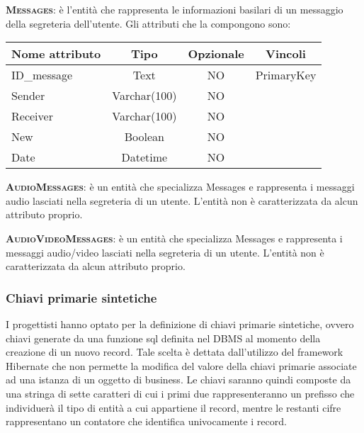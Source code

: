 \begin{description}
	\item{\scshape\bfseries Messages}: è l'entità che rappresenta le informazioni basilari di un messaggio della segreteria dell'utente. Gli attributi che la compongono sono:

\begin{center}
\begin{tabular}{lccc}
\toprule
Nome attributo & Tipo & Opzionale & Vincoli\\
\midrule %
ID\_message & Text & NO & PrimaryKey\\
Sender & Varchar(100) & NO & \\
Receiver & Varchar(100) & NO & \\
New & Boolean & NO & \\
Date & Datetime & NO & \\
\bottomrule
\end{tabular}
\end{center}	
	
	\item{\scshape\bfseries AudioMessages}: è un entità che specializza Messages e rappresenta i messaggi audio lasciati nella segreteria di un utente. L'entità non è caratterizzata da alcun attributo proprio.
	
	\item{\scshape\bfseries AudioVideoMessages}: è un entità che specializza Messages e rappresenta i messaggi audio/video lasciati nella segreteria di un utente.  L'entità non è caratterizzata da alcun attributo proprio.	
	
\end{description}

\subsubsection{Chiavi primarie sintetiche}
I progettisti hanno optato per la definizione di chiavi primarie sintetiche, ovvero chiavi generate da una funzione sql definita nel DBMS al momento della creazione di un nuovo record. Tale scelta è dettata dall'utilizzo del framework Hibernate che non permette la modifica del valore della chiavi primarie associate ad una istanza di un oggetto di business. Le chiavi saranno quindi composte da una stringa di sette caratteri di cui i primi due rappresenteranno un prefisso che individuerà il tipo di entità a cui appartiene il record, mentre le restanti cifre rappresentano un contatore che identifica univocamente i record.

